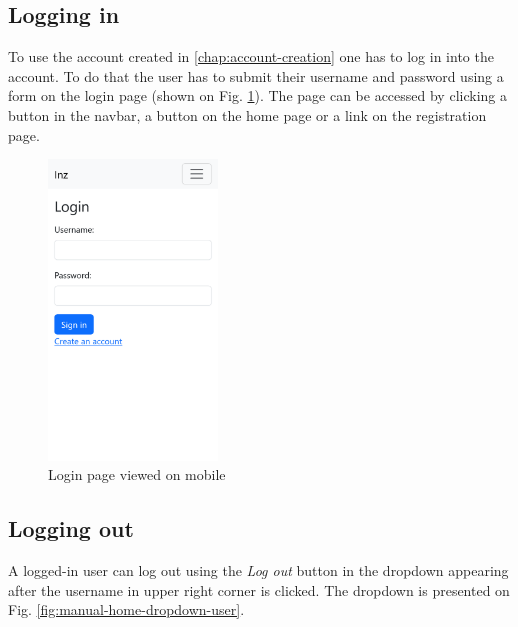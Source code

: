 \subsection{Logging in}

To use the account created in \ref{chap:account-creation} one has to log in into the account. To do that the user has to submit their username and password using a form on the login page (shown on Fig. \ref{fig:manual-login}). The page can be accessed by clicking a button in the navbar, a button on the home page or a link on the registration page.

\begin{figure}
    \centering
    \includegraphics[width=0.4\textwidth]{img/manual-login.png}
    \caption{Login page viewed on mobile}
    \label{fig:manual-login}
\end{figure}

\subsection{Logging out}

A logged-in user can log out using the \textit{Log out} button in the dropdown appearing after the username in upper right corner is clicked. The dropdown is presented on Fig. \ref{fig:manual-home-dropdown-user}.


